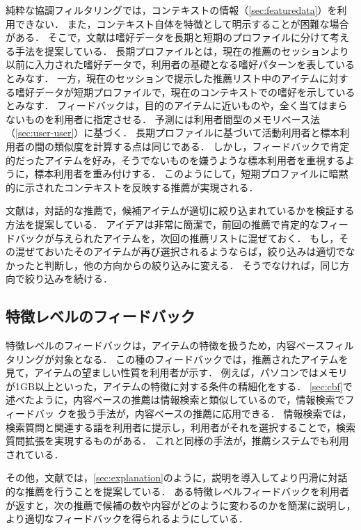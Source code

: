 純粋な協調フィルタリングでは，コンテキストの情報（\ref{sec:featuredata}）を利用できない．
また，コンテキスト自体を特徴として明示することが困難な場合がある．
そこで，文献\cite{ej:051}は嗜好データを長期と短期のプロファイルに分けて考える手法を提案している．
長期プロファイルとは，現在の推薦のセッションより以前に入力された嗜好データで，利用者の基礎となる嗜好パターンを表しているとみなす．
一方，現在のセッションで提示した推薦リスト中のアイテムに対する嗜好データが短期プロファイルで，現在のコンテキストでの嗜好を示しているとみなす．
フィードバックは，目的のアイテムに近いものや，全く当てはまらないものを利用者に指定させる．
予測には利用者間型のメモリベース法（\ref{sec:user-user}）に基づく．
長期プロファイルに基づいて活動利用者と標本利用者の間の類似度を計算する点は同じである．
しかし，フィードバックで肯定的だったアイテムを好み，そうでないものを嫌うような標本利用者を重視するように，標本利用者を重み付けする．
このようにして，短期プロファイルに暗黙的に示されたコンテキストを反映する推薦が実現される．

文献\cite{ijcai:03:04}は，対話的な推薦で，候補アイテムが適切に絞り込まれているかを検証する方法を提案している．
アイデアは非常に簡潔で，前回の推薦で肯定的なフィードバックが与えられたアイテムを，次回の推薦リストに混ぜておく．
もし，その混ぜておいたそのアイテムが再び選択されるようならば，絞り込みは適切でなかったと判断し，他の方向からの絞り込みに変える．
そうでなければ，同じ方向で絞り込みを続ける．

\subsection{特徴レベルのフィードバック}

特徴レベルのフィードバックは，アイテムの特徴を扱うため，内容ベースフィルタリングが対象となる．
この種のフィードバックでは，推薦されたアイテムを見て，アイテムの望ましい性質を利用者が示す．
例えば，パソコンではメモリが1GB以上といった，アイテムの特徴に対する条件の精細化をする．
\ref{sec:cbf}で述べたように，内容ベースの推薦は情報検索と類似しているので，情報検索でフィードバッ
クを扱う手法が，内容ベースの推薦に応用できる．
情報検索では，検索質問と関連する語を利用者に提示し，利用者がそれを選択することで，検索質問拡張を実現するものがある．
これと同様の手法が，推薦システムでも利用されている\cite{ec:024}．

その他，文献\cite{ej:049}では，\ref{sec:explanation}のように，説明を導入してより円滑に対話的な推薦を行うことを提案している．
ある特徴レベルフィードバックを利用者が返すと，次の推薦で候補の数や内容がどのように変わるのかを簡潔に説明し，より適切なフィードバックを得られるようにしている．

